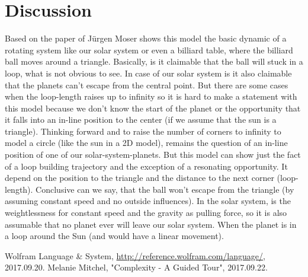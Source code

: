 \documentclass[11pt,a4paper]{article}
\begin{document}
\section{Discussion}
Based on the paper of J{\"u}rgen Moser \cite{moser} shows this model the basic dynamic of a rotating system like our solar system or even a billiard table, where the billiard ball moves around a triangle. Basically, is it claimable that the ball will stuck in a loop, what is not obvious to see. In case of our solar system is it also claimable that the planets can’t escape from the central point. But there are some cases when the loop-length raises up to infinity so it is hard to make a statement with this model because we don’t know the start of the planet or the opportunity that it falls into an in-line position to the center (if we assume that the sun is a triangle). Thinking forward and to raise the number of corners to infinity to model a circle (like the sun in a 2D model), remains the question of an in-line position of one of our solar-system-planets. But this model can show just the fact of a loop building trajectory and the exception of a resonating opportunity. It depend on the position to the triangle and the distance to the next corner (loop-length). Conclusive can we say, that the ball won't escape from the triangle (by assuming constant speed and no outside influences). In the solar system, is the weightlessness for constant speed and the gravity as pulling force, so it is also assumable that no planet ever will leave our solar system. When the planet is in a loop around the Sun (and would have a linear movement).

\listoffigures

\begin{thebibliography}{2}

 Wolfram Language \& System, \url{http://reference.wolfram.com/language/}, 2017.09.20.
  Melanie Mitchel, "Complexity - A Guided Tour", 2017.09.22.

\end{thebibliography}
\end{document}
